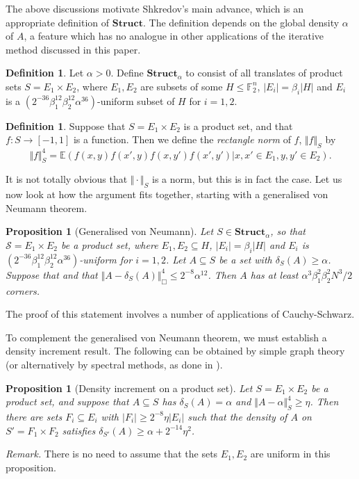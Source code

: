 \documentclass[12pt,a4paper,reqno]{amsart}
\numberwithin{equation}{section}
\theoremstyle{plain}
\newtheorem{proposition}[subsection]{Proposition}
\theoremstyle{definition}
\newtheorem{definition}[subsection]{Definition}
\renewcommand{\leq}{\leqslant}
\renewcommand{\geq}{\geqslant}
\begin{document}
\noindent The above discussions motivate Shkredov's main advance, which is an appropriate definition of $\mathbf{Struct}$. The definition depends on the global density $\alpha$ of $A$, a feature which has no analogue in other applications of the iterative method discussed in this paper. 

\begin{definition}\label{struct-def}
Let $\alpha > 0$. Define $\mathbf{Struct}_{\alpha}$ to consist of all translates of product sets $S = E_1 \times E_2$, where $E_1,E_2$ are subsets of some $H \leq \mathbb{F}_2^n$, $|E_i| = \beta_i |H|$ and $E_i$ is a $(2^{-36}\beta_1^{12}\beta_2^{12} \alpha^{36})$-uniform subset of $H$ for $i = 1,2$. 
\end{definition}


\begin{definition}\label{rect-norm} Suppose that $S = E_1 \times E_2$ is a product set,  and that $f : S \rightarrow [-1,1]$ is a function. Then we define the \emph{rectangle norm} of $f$, $\Vert f \Vert_{S}$ by
\[ \Vert f \Vert_{S}^4 = \mathbb{E}\left( f(x,y)f(x',y)f(x,y')f(x',y') | x,x' \in E_1, y,y' \in E_2\right).\] 
\end{definition}

\noindent It is not totally obvious that $\Vert \cdot \Vert_S$ is a norm, but this is in fact the case.
Let us now look at how the argument fits together, starting with a generalised von Neumann theorem.

\begin{proposition}[Generalised von Neumann]\label{gvn}
Let $S \in \mathbf{Struct}_{\alpha}$, so that $\mathcal{S} = E_1 \times E_2$ be a product set, where $E_1,E_2 \subseteq H$, $|E_i| = \beta_i |H|$ and $E_i$ is $(2^{-36}\beta_1^{12}\beta_2^{12} \alpha^{36})$-uniform for $i= 1,2$. Let $A \subseteq S$ be a set with $\delta_{S}(A) \geq  \alpha$. Suppose that  and that $\Vert A - \delta_S(A)\Vert_{\Box}^4 \leq 2^{-8}\alpha^{12}$. Then $A$ has at least $\alpha^3 \beta_1^2\beta_2^2 N^3/2$ corners.
\end{proposition}
\noindent The proof of this statement involves a number of applications of Cauchy-Schwarz.\vspace{11pt}

\noindent To complement the generalised von Neumann theorem, we must establish a density increment result.
The following can be obtained by simple graph theory (or alternatively by spectral methods, as done in \cite{shkredov}).

\begin{proposition}[Density increment on a product set]\label{prop5.7} Let $S = E_1 \times E_2$ be a product set, and suppose that $A \subseteq S$ has $\delta_{S}(A) = \alpha$ and $\Vert A - \alpha \Vert_{S}^4 \geq \eta$. Then there are sets $F_i \subseteq E_i$ with $|F_i| \geq 2^{-8}\eta|E_i|$ such that the density of $A$ on $S' = F_1 \times F_2$ satisfies $\delta_{S'}(A) \geq \alpha + 2^{-14}\eta^2$.
\end{proposition}
\noindent\textit{Remark.} There is no need to assume that the sets $E_1,E_2$ are uniform in this proposition.
\end{document}
